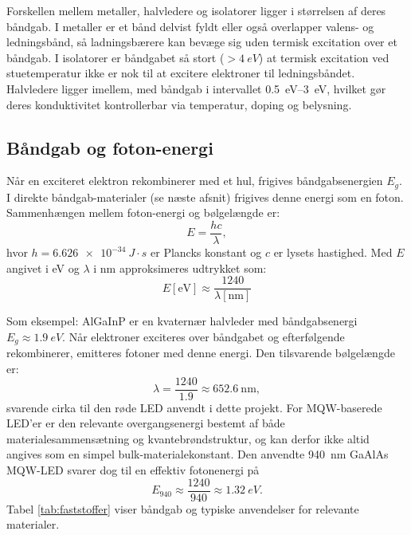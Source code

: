Forskellen mellem metaller, halvledere og isolatorer ligger i størrelsen af deres båndgab. I metaller er et bånd delvist fyldt eller også overlapper valens- og ledningsbånd, så ladningsbærere kan bevæge sig uden termisk excitation over et båndgab. I isolatorer er båndgabet så stort ($> \SI{4}{eV}$) at termisk excitation ved stuetemperatur ikke er nok til at excitere elektroner til ledningsbåndet. Halvledere ligger imellem, med båndgab i intervallet \SIrange{0.5}{3}{eV}, hvilket gør deres konduktivitet kontrollerbar via temperatur, doping og belysning.

\subsection{Båndgab og foton-energi}

Når en exciteret elektron rekombinerer med et hul, frigives båndgabsenergien $E_g$. I direkte båndgab-materialer (se næste afsnit) frigives denne energi som en foton. Sammenhængen mellem 
foton-energi og bølgelængde er:
\begin{equation}
\label{eq:bølgelængde_energi}
    E = \frac{hc}{\lambda},
\end{equation}
hvor $h = \SI{6.626e-34}{J\cdot s}$ er Plancks konstant og $c$ er lysets hastighed. Med $E$ angivet i eV og $\lambda$ i nm approksimeres udtrykket som:
\begin{equation}
    E[\text{eV}] \approx \frac{1240}{\lambda [\text{nm}]}
\end{equation}

Som eksempel: AlGaInP er en kvaternær halvleder med båndgabsenergi $E_g \approx \SI{1.9}{eV}$. Når elektroner exciteres over båndgabet og efterfølgende rekombinerer, emitteres fotoner med denne energi. Den tilsvarende bølgelængde er:
\begin{equation}
    \lambda = \frac{1240}{1.9} \approx 652.6\ \text{nm},
\end{equation}
svarende cirka til den røde LED anvendt i dette projekt. For MQW-baserede LED'er er den relevante overgangsenergi bestemt af både materialesammensætning og kvantebrøndstruktur, og kan derfor ikke altid angives som en simpel bulk-materialekonstant. Den anvendte \SI{940}{nm} GaAlAs MQW-LED svarer dog til en effektiv fotonenergi på
\begin{equation}
    E_{940} \approx \frac{1240}{940} \approx \SI{1.32}{eV}.
\end{equation}
Tabel \ref{tab:faststoffer} viser båndgab og typiske anvendelser for relevante materialer.

